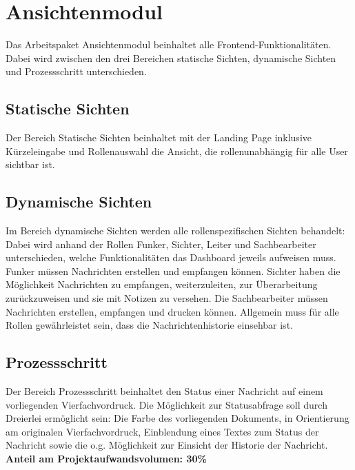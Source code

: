 \section{Ansichtenmodul} 
Das Arbeitspaket Ansichtenmodul beinhaltet alle Frontend-Funktionalitäten. 
Dabei wird zwischen den drei Bereichen statische Sichten, dynamische Sichten 
und Prozessschritt unterschieden. 
\subsection{Statische Sichten}
Der Bereich Statische Sichten beinhaltet mit der Landing Page inklusive 
Kürzeleingabe und Rollenauswahl die Ansicht, die rollenunabhängig für 
alle User sichtbar ist. 
\subsection{Dynamische Sichten}
Im Bereich dynamische Sichten werden alle rollenspezifischen Sichten 
behandelt: Dabei wird anhand der Rollen Funker, Sichter, Leiter und 
Sachbearbeiter unterschieden, welche Funktionalitäten das Dashboard jeweils 
aufweisen muss. Funker müssen Nachrichten erstellen und empfangen können.
Sichter haben die Möglichkeit Nachrichten zu empfangen, weiterzuleiten, zur 
Überarbeitung zurückzuweisen und sie mit Notizen zu versehen. Die Sachbearbeiter 
müssen Nachrichten erstellen, empfangen und drucken können. 
Allgemein muss für alle Rollen gewährleistet sein, dass die 
Nachrichtenhistorie einsehbar ist. 
\subsection{Prozessschritt}
Der Bereich Prozessschritt beinhaltet den Status einer Nachricht 
auf einem vorliegenden Vierfachvordruck. Die Möglichkeit zur Statusabfrage 
soll durch Dreierlei ermöglicht sein: Die Farbe des vorliegenden Dokuments, 
in Orientierung am originalen Vierfachvordruck, Einblendung eines 
Textes zum Status der Nachricht sowie die o.g. Möglichkeit zur Einsicht der 
Historie der Nachricht.\\
\textbf{Anteil am Projektaufwandsvolumen: 30\%}